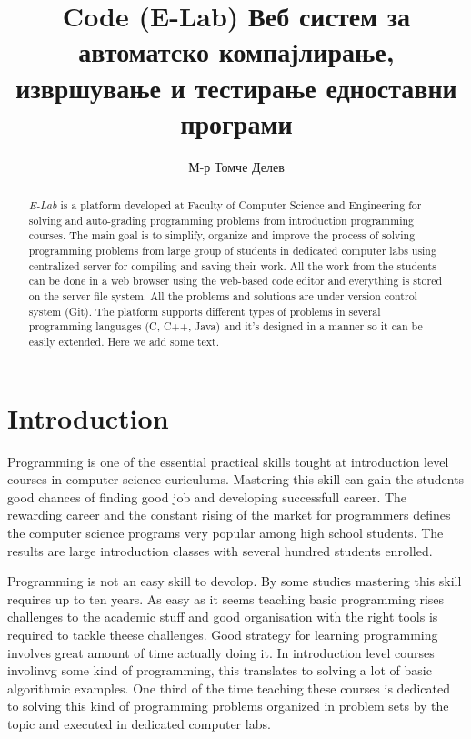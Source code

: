\documentclass{article}
\begin{document}
\title{Code (E-Lab) Веб систем за автоматско компајлирање, извршување и
тестирање едноставни програми}

\author{М-р Томче Делев}

\maketitle

\begin{abstract}

\emph{E-Lab} is a platform developed at Faculty of Computer Science and
Engineering for solving and auto-grading programming problems from introduction
programming courses. The main goal is to simplify, organize and
improve the process of solving programming problems from large group of
students in dedicated computer labs using centralized server for compiling and saving their
work. All the work from the students can be done in a web browser using the
web-based code editor and everything is stored on the server file system.
All the problems and solutions are under version control system (Git). The
platform supports different types of problems in several programming languages
(C, C++, Java) and it's designed in a manner so it can be easily extended. Here
we add some text.
\end{abstract}

\section{Introduction}
Programming is one of the essential practical skills tought at introduction
level courses in computer science curiculums. Mastering this skill can gain the
students good chances of finding good job and developing successfull career. The
rewarding career and the constant rising of the market for programmers defines
the computer science programs very popular among high school students. The results
are large introduction classes with several hundred students enrolled. 

Programming is not an easy skill to devolop. By some studies
\cite{winslow1996programming} mastering this skill requires up to ten years. As
easy as it seems teaching basic programming rises challenges to the academic
stuff and good organisation with the right tools is required to tackle theese
challenges. Good strategy for learning
programming involves great amount of time actually doing it. In introduction
level courses involinvg some kind of programming, this translates to solving a
lot of basic algorithmic examples. One third of the time teaching these courses
is dedicated to solving this kind of programming problems organized in problem sets by the
topic and executed in dedicated computer labs.
\end{document}
